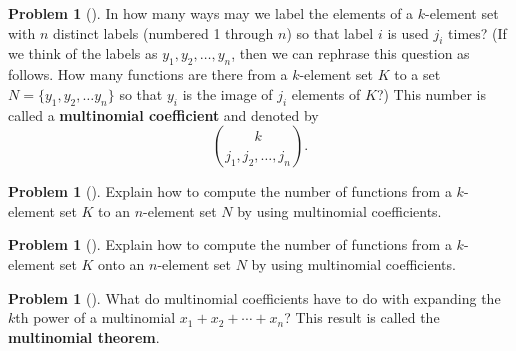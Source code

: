 \documentclass[10pt,]{book}
\newcommand{\terminology}[1]{\textbf{#1}}
\theoremstyle{plain}
\theoremstyle{definition}
\newtheorem{activity}[project]{Problem}
\theoremstyle{definition}
\numberwithin{equation}{chapter}
\begin{document}
\begin{activity}[] \label{activity-148}
In how many ways may we label the elements of a \(k\)-element set with \(n\) distinct labels (numbered 1 through \(n\)) so that label \(i\) is used \(j_i\) times? (If we think of the labels as \(y_1, y_2, \ldots, y_n\), then we can rephrase this question as follows.  How many functions are there from a \(k\)-element set \(K\) to a set \(N=\{y_1,y_2,\ldots y_n\}\) so that \(y_i\) is the image of \(j_i\) elements of \(K\)?) This number is called a \terminology{multinomial coefficient} and denoted by%
\begin{equation*}
\binom{k}{j_1,j_2,\ldots, j_n}.
\end{equation*}
%
\end{activity}
\begin{activity}[]\marginsymbol[-1em]{} \label{activity-149}
Explain how to compute the number of functions from a \(k\)-element set \(K\) to an \(n\)-element set \(N\) by using multinomial coefficients.%
\end{activity}
\begin{activity}[]\marginsymbol[-1em]{} \label{activity-150}
Explain how to compute the number of functions from a \(k\)-element set \(K\) onto an \(n\)-element set \(N\) by using multinomial coefficients.%
\end{activity}
\begin{activity}[] \label{activity-151}
What do multinomial coefficients have to do with expanding the \(k\)th power of a multinomial \(x_1+x_2+\cdots+x_n\)? This result is called the \terminology{multinomial theorem}.%
\end{activity}
\typeout{************************************************}
\typeout{************************************************}
\end{document}
